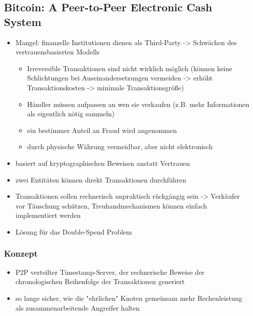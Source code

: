 \subsection*{Bitcoin: A Peer-to-Peer Electronic Cash System}\cite{Nakamoto2008}

    \begin{itemize}
        \item Mangel: finanzelle Institutionen dienen als Third-Party -> Schwächen des vertrauensbasierten Modells
        \begin{itemize}
            \item Irreversible Transaktionen sind nicht wirklich möglich (können keine Schlichtungen bei Auseinandersetzungen vermeiden -> erhöht Transaktionskosten -> minimale Transaktionsgröße)
            \item Händler müssen aufpassen an wen sie verkaufen (z.B. mehr Informationen als eigentlich nötig sammeln)
            \item ein bestimmer Anteil an Fraud wird angenommen
            \item durch physische Währung vermeidbar, aber nicht elektronisch
        \end{itemize}
        \item basiert auf kryptographischen Beweisen anstatt Vertrauen
        \item zwei Entitäten können direkt Transaktionen durchführen
        \item Transaktionen sollen rechnerisch unpraktisch rückgängig sein -> Verkäufer vor Täuschung schützen, Treuhandmechanismen können einfach implementiert werden
        \item Lösung für das Double-Spend Problem
    \end{itemize}

\subsubsection*{Konzept}
    \begin{itemize}
        \item P2P verteilter Timestamp-Server, der rechnerische Beweise der chronologischen Reihenfolge der Transaktionen generiert
        \item so lange sicher, wie die "ehrlichen" Knoten gemeinsam mehr Rechenleistung als zusammenarbeitende Angreifer halten
    \end{itemize}

